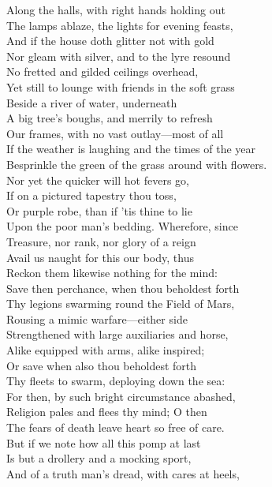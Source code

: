 Along the halls, with right hands holding out\\
The lamps ablaze, the lights for evening feasts,\\
And if the house doth glitter not with gold\\
Nor gleam with silver, and to the lyre resound\\
No fretted and gilded ceilings overhead,\\
Yet still to lounge with friends in the soft grass\\
Beside a river of water, underneath\\
A big tree's boughs, and merrily to refresh\\
Our frames, with no vast outlay—most of all\\
If the weather is laughing and the times of the year\\
Besprinkle the green of the grass around with flowers.\\
Nor yet the quicker will hot fevers go,\\
If on a pictured tapestry thou toss,\\
Or purple robe, than if 'tis thine to lie\\
Upon the poor man's bedding. Wherefore, since\\
Treasure, nor rank, nor glory of a reign\\
Avail us naught for this our body, thus\\
Reckon them likewise nothing for the mind:\\
Save then perchance, when thou beholdest forth\\
Thy legions swarming round the Field of Mars,\\
Rousing a mimic warfare—either side\\
Strengthened with large auxiliaries and horse,\\
Alike equipped with arms, alike inspired;\\
Or save when also thou beholdest forth\\
Thy fleets to swarm, deploying down the sea:\\
For then, by such bright circumstance abashed,\\
Religion pales and flees thy mind; O then\\
The fears of death leave heart so free of care.\\
But if we note how all this pomp at last\\
Is but a drollery and a mocking sport,\\
And of a truth man's dread, with cares at heels,\\
